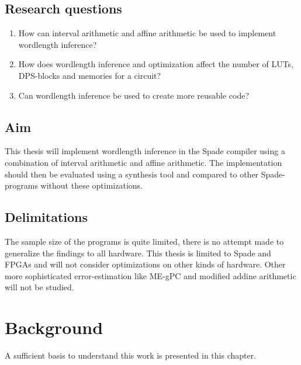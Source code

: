 \documentclass[msc,lith,english]{liuthesis}
\begin{document}
\section{Research questions}
\begin{enumerate}
  \item How can interval arithmetic and affine arithmetic be used to implement wordlength inference?
  \item How does wordlength inference and optimization affect the number of LUTs, DPS-blocks and memories for a circuit?
  \item Can wordlength inference be used to create more reusable code?
\end{enumerate}

\section{Aim}
This thesis will implement wordlength inference in the Spade compiler using a combination of interval arithmetic and affine arithmetic. The implementation should then be evaluated using a synthesis tool and compared to other Spade-programs without these optimizations.

\section{Delimitations}
The sample size of the programs is quite limited, there is no attempt made to generalize the findings to all hardware. This thesis is limited to Spade and FPGAs and will not consider optimizations on other kinds of hardware. Other more sophisticated error-estimation like ME-gPC and modified addine arithmetic will not be studied.

\chapter{Background}
\label{chaBackground}
A sufficient basis to understand this work is presented in this chapter.

% 
\end{document}
